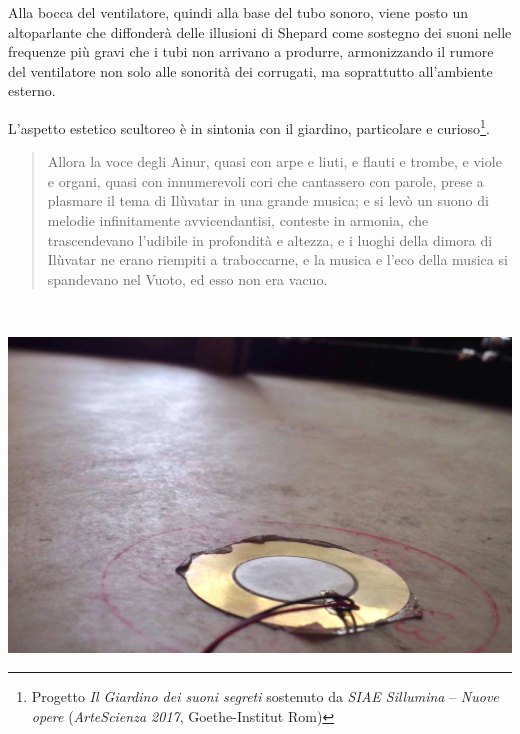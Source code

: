 \documentclass[
	a0,
	portrait
	]{a0poster}
\begin{document}
\begin{multicols}{4}
Alla bocca del ventilatore, quindi alla base del tubo sonoro, viene posto un altoparlante che diffonderà delle illusioni di Shepard come sostegno dei suoni nelle frequenze più gravi che i tubi non arrivano a produrre, armonizzando il rumore del ventilatore non solo alle sonorità dei corrugati, ma soprattutto all’ambiente esterno.

L’aspetto estetico scultoreo è in sintonia con il giardino, particolare e curioso\footnote{\label{note1}\color{cpurple} Progetto \emph{Il Giardino dei suoni segreti} sostenuto da \emph{SIAE Sillumina} – \emph{Nuove opere} (\emph{ArteScienza 2017}, Goethe-Institut Rom)}.

\bigskip

\begin{quotation}
\begin{it}
\begin{flushright}
\noindent Allora la voce degli Ainur, quasi con arpe e liuti, e flauti e trombe, e viole e organi, quasi con innumerevoli cori che cantassero con parole, prese a plasmare il tema di Ilùvatar in una grande musica; e si levò un suono di melodie infinitamente avvicendantisi, conteste in armonia, che trascendevano l’udibile in profondità e altezza, e i luoghi della dimora di Ilùvatar ne erano riempiti a traboccarne, e la musica e l’eco della musica si spandevano nel Vuoto, ed esso non era vacuo.
\end{flushright}
\end{it}
\end{quotation}

\vfill

~

\columnbreak


\begin{center}
\includegraphics[width=1.\linewidth]{23714923_10155152202522951_954200240_o}
\end{center}


\end{multicols}
\end{document}
